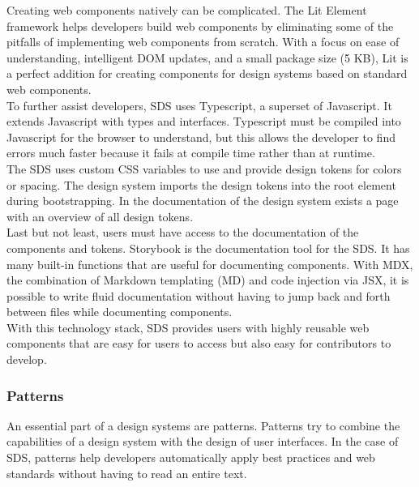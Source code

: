 Creating web components natively can be complicated. The Lit Element framework helps developers build web components by eliminating some of the pitfalls of implementing web components from scratch. With a focus on ease of understanding, intelligent DOM updates, and a small package size (5 KB), Lit is a perfect addition for creating components for design systems based on standard web components. \citep{lit_nodate} \\

To further assist developers, \ac{SDS} uses Typescript, a superset of Javascript. It extends Javascript with types and interfaces. Typescript must be compiled into Javascript for the browser to understand, but this allows the developer to find errors much faster because it fails at compile time rather than at runtime. \citep{microsoft_typescript_nodate} \\

The \ac{SDS} uses custom CSS variables to use and provide design tokens for colors or spacing. The design system imports the design tokens into the root element during bootstrapping. In the documentation of the design system exists a page with an overview of all design tokens. \citep{mdn_css_vars_nodate} \\

Last but not least, users must have access to the documentation of the components and tokens. Storybook is the documentation tool for the \ac{SDS}. It has many built-in functions that are useful for documenting components. With MDX, the combination of Markdown templating (MD) and code injection via JSX, it is possible to write fluid documentation without having to jump back and forth between files while documenting components. \citep{otander_markdown_2017} \\

With this technology stack, \ac{SDS} provides users with highly reusable web components that are easy for users to access but also easy for contributors to develop.


\subsubsection{Patterns}
An essential part of a design systems are patterns. Patterns try to combine the capabilities of a design system with the design of user interfaces. In the case of \ac{SDS}, patterns help developers automatically apply best practices and web standards without having to read an entire text. \\

